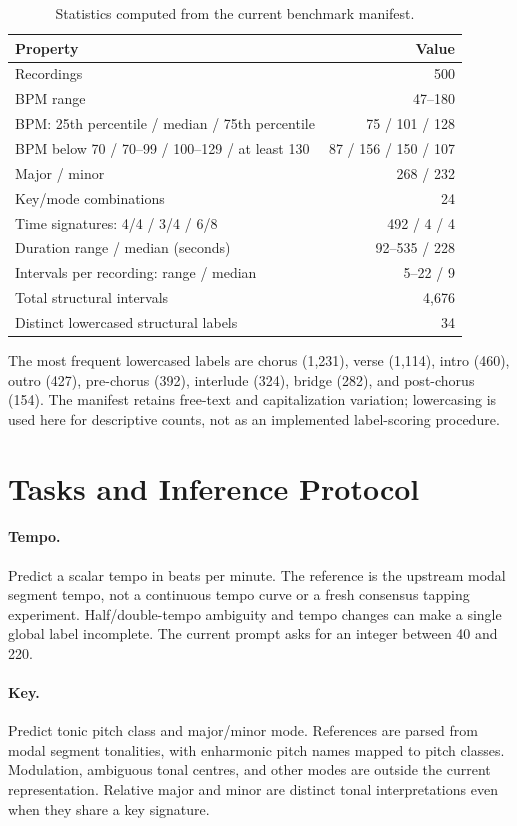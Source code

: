 \documentclass[11pt,a4paper]{article}
\begin{document}
\begin{table}[tbp]
\centering\small
\begin{tabularx}{\linewidth}{@{}Xr@{}}
\toprule
Property & Value \\
\midrule
Recordings & 500 \\
BPM range & 47--180 \\
BPM: 25th percentile / median / 75th percentile & 75 / 101 / 128 \\
BPM below 70 / 70--99 / 100--129 / at least 130 & 87 / 156 / 150 / 107 \\
Major / minor & 268 / 232 \\
Key/mode combinations & 24 \\
Time signatures: 4/4 / 3/4 / 6/8 & 492 / 4 / 4 \\
Duration range / median (seconds) & 92--535 / 228 \\
Intervals per recording: range / median & 5--22 / 9 \\
Total structural intervals & 4,676 \\
Distinct lowercased structural labels & 34 \\
\bottomrule
\end{tabularx}
\caption{Statistics computed from the current benchmark manifest.}
\label{tab:stats}
\end{table}

The most frequent lowercased labels are chorus (1,231), verse (1,114), intro (460), outro (427), pre-chorus (392), interlude (324), bridge (282), and post-chorus (154). The manifest retains free-text and capitalization variation; lowercasing is used here for descriptive counts, not as an implemented label-scoring procedure.

\section{Tasks and Inference Protocol}
\label{sec:tasks}
\paragraph{Tempo.}
Predict a scalar tempo in beats per minute. The reference is the upstream modal segment tempo, not a continuous tempo curve or a fresh consensus tapping experiment. Half/double-tempo ambiguity and tempo changes can make a single global label incomplete. The current prompt asks for an integer between 40 and 220.

\paragraph{Key.}
Predict tonic pitch class and major/minor mode. References are parsed from modal segment tonalities, with enharmonic pitch names mapped to pitch classes. Modulation, ambiguous tonal centres, and other modes are outside the current representation. Relative major and minor are distinct tonal interpretations even when they share a key signature.
\end{document}
